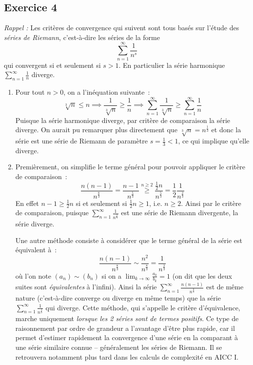 \documentclass{article}
\begin{document}
\subsection{Exercice 4}
\textit{Rappel :} Les critères de convergence qui suivent sont tous basés sur l'étude des \emph{séries de Riemann}, c'est-à-dire les séries de la forme
\[
\sum_{n = 1}^{\infty} \frac{1}{n^s}
\]
qui convergent si et seulement si $s > 1$. En particulier la série harmonique $\displaystyle\sum_{n = 1}^{\infty} \frac{1}{n}$ diverge.

\begin{enumerate}
    \item Pour tout $n > 0$, on a l'inéquation suivante~:
    \[
    \sqrt[3]{n} \leq n \implies \frac{1}{\sqrt[3]{n}} \geq \frac{1}{n} \implies \sum_{n = 1}^{\infty} \frac{1}{\sqrt[3]{n}} \geq \sum_{n = 1}^{\infty} \frac{1}{n}
    \]
    Puisque la série harmonique diverge, par critère de comparaison la série diverge. On aurait pu remarquer plus directement que $\sqrt[3]{n} = n^{\frac{1}{3}}$ et donc la série est une série de Riemann de paramètre $s = \frac{1}{3} < 1$, ce qui implique qu'elle diverge.
    
    \item Premièrement, on simplifie le terme général pour pouvoir appliquer le critère de comparaison~:
    \[
    \frac{n(n-1)}{n^{\frac{8}{3}}} = \frac{n - 1}{n^{\frac{5}{3}}} \overset{n \geq 2}{\geq} \frac{\frac{1}{2}n}{n^{\frac{5}{3}}} = \frac{1}{2} \frac{1}{n^{\frac{2}{3}}}
    \]
    En effet $n - 1 \geq \frac{1}{2}n$ si et seulement si $\frac{1}{2}n \geq 1$, i.e. $n \geq 2$. Ainsi par le critère de comparaison, puisque $\displaystyle \sum_{n = 1}^{\infty} \frac{1}{n^{\frac{2}{3}}}$ est une série de Riemann divergente, la série diverge.
    
    Une autre méthode consiste à considérer que le terme général de la série est équivalent à~:
    \[
    \frac{n(n - 1)}{n^{\frac{8}{3}}} \sim \frac{n^2}{n^{\frac{8}{3}}} = \frac{1}{n^{\frac{2}{3}}}
    \]
    où l'on note $(a_n) \sim (b_n)$ si on a $\displaystyle\lim_{k \to \infty} \frac{a_k}{b_k} = 1$ (on dit que les deux suites sont \emph{équivalentes} à l'infini). Ainsi la série $\displaystyle\sum_{n = 1}^{\infty} \frac{n(n-1)}{n^{\frac{8}{3}}}$ est de même nature (c'est-à-dire converge ou diverge en même temps) que la série $\displaystyle\sum_{n = 1}^{\infty} \frac{1}{n^{\frac{2}{3}}}$ qui diverge. Cette méthode, qui s'appelle le critère d'équivalence, marche uniquement \emph{lorsque les 2 séries sont de termes positifs}. Ce type de raisonnement par ordre de grandeur a l'avantage d'être plus rapide, car il permet d'estimer rapidement la convergence d'une série en la comparant à une série similaire connue -- généralement les séries de Riemann. Il se retrouvera notamment plus tard dans les calculs de complexité en AICC I.
    

\end{enumerate}
\end{document}
